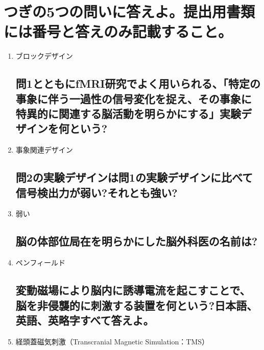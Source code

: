 \documentclass[titlepage,a4paper]{jsarticle}
\begin{document}
\section{つぎの5つの問いに答えよ。提出用書類には番号と答えのみ記載すること。}%
\begin{enumerate}
      \subsection{「1つの実験条件を20秒~60秒の時間単位で提示したのち、別の実験条件を同程度の時間提示し、これを繰り返す」といったfMRI研究で用いられる実験デザインを何という?}
      \item ブロックデザイン
            \subsection{問1とともにfMRI研究でよく用いられる、「特定の事象に伴う一過性の信号変化を捉え、その事象に特異的に関連する脳活動を明らかにする」実験デザインを何という?}
      \item 事象関連デザイン
            \subsection{問2の実験デザインは問1の実験デザインに比べて信号検出力が弱い?それとも強い?}
      \item 弱い
            \subsection{脳の体部位局在を明らかにした脳外科医の名前は?}
      \item ペンフィールド
            \subsection{変動磁場により脳内に誘導電流を起こすことで、脳を非侵襲的に刺激する装置を何という?日本語、英語、英略字すべて答えよ。}
      \item 経頭蓋磁気刺激（Transcranial Magnetic Simulation：TMS）
\end{enumerate}
\end{document}
